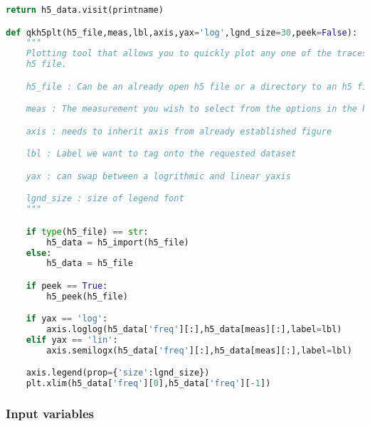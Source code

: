 \begin{lstlisting}[frame=single, language=Python]
    return h5_data.visit(printname)

def qkh5plt(h5_file,meas,lbl,axis,yax='log',lgnd_size=30,peek=False):
    """
    Plotting tool that allows you to quickly plot any one of the traces from an
    h5 file.

    h5_file : Can be an already open h5 file or a directory to an h5 file

    meas : The measurement you wish to select from the options in the h5 file

    axis : needs to inherit axis from already established figure

    lbl : Label we want to tag onto the requested dataset

    yax : can swap between a logrithmic and linear yaxis

    lgnd_size : size of legend font
    """

    if type(h5_file) == str:
        h5_data = h5_import(h5_file)
    else:
        h5_data = h5_file

    if peek == True:
        h5_peek(h5_file)

    if yax == 'log':
        axis.loglog(h5_data['freq'][:],h5_data[meas][:],label=lbl)
    elif yax == 'lin':
        axis.semilogx(h5_data['freq'][:],h5_data[meas][:],label=lbl)

    axis.legend(prop={'size':lgnd_size})
    plt.xlim(h5_data['freq'][0],h5_data['freq'][-1])

\end{lstlisting}

\subsubsection{Input variables}\label{input-variables}

